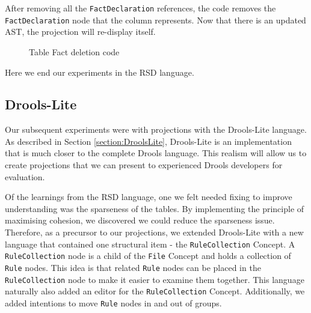 After removing all the \texttt{FactDeclaration} references, the code removes the \texttt{FactDeclaration}  node that the column represents.
Now that there is an updated AST, the projection will re-display itself. 

\begin{figure}
    \centering
    \caption{Table Fact deletion code}
    \label{fig:tableFactDeletion}
\end{figure}

Here we end our experiments in the RSD language.

\newpage

\subsection{Drools-Lite}

Our subsequent experiments were with projections with the Drools-Lite language.
As described in Section \ref{section:DroolsLite}, Drools-Lite is an implementation that is much closer to the complete Drools language.
This realism will allow us to create projections that we can present to experienced Drools developers for evaluation.

Of the learnings from the RSD language, one we felt needed fixing to improve understanding was the sparseness of the tables.
By implementing the principle of maximising cohesion, we discovered we could reduce the sparseness issue.
Therefore, as a precursor to our projections, we extended Drools-Lite with a new language that contained one structural item - the \texttt{RuleCollection} Concept.
A \texttt{RuleCollection} node is a child of the \texttt{File} Concept and holds a collection of \texttt{Rule} nodes.
This idea is that related \texttt{Rule} nodes can be placed in the \texttt{RuleCollection}  node to make it easier to examine them together.
This language naturally also added an editor for the \texttt{RuleCollection} Concept.
Additionally, we added intentions to move \texttt{Rule} nodes in and out of groups.

